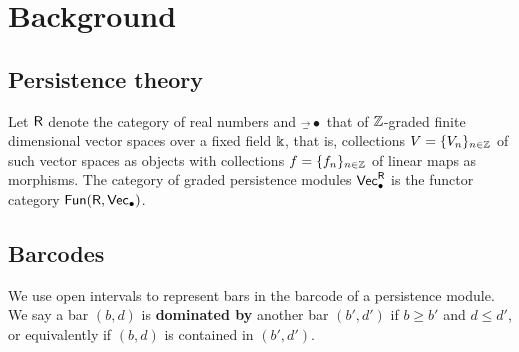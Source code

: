 
\section{Background}

\subsection{Persistence theory}

Let $\mathsf{R}$ denote the category of real numbers and $\Vec_\bullet$ that of $\mathbb{Z}$-graded finite dimensional vector spaces over a fixed field $\Bbbk$, that is, collections $V = \{V_n\}_{n\in\mathbb{Z}}$ of such vector spaces as objects with collections $f = \{f_n\}_{n\in\mathbb{Z}}$ of linear maps as morphisms.
The category of graded persistence modules $\mathsf{Vec}_\bullet^{\mathsf{R}}$ is the functor category $\mathsf{Fun}(\mathsf{R}, \mathsf{Vec}_\bullet)$.

\subsection{Barcodes}

We use open intervals to represent bars in the barcode of a persistence module. We say a bar $(b,d)$ is \textbf{dominated by} another bar $(b',d')$ if $b\geq b'$ and $d\leq d'$, or equivalently if $(b,d)$ is contained in $(b',d')$.